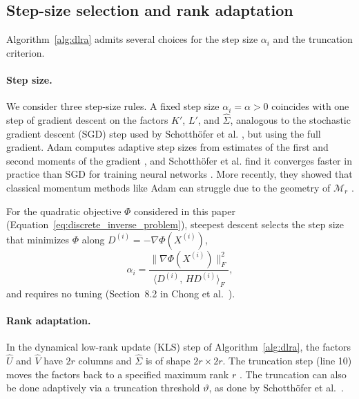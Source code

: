 \subsection{Step-size selection and rank adaptation}
Algorithm~\ref{alg:dlra} admits several choices for the step size $\alpha_i$ and the truncation criterion.

\paragraph{Step size.}
We consider three step-size rules. A fixed step size $\alpha_i = \alpha > 0$ coincides with one step of gradient descent on the factors $K'$, $L'$, and
$\hat \Sigma$, analogous to the stochastic gradient descent (SGD) step used by Schotthöfer et al. \cite{schotthoferLowrankLotteryTickets2022}, but using the full gradient. Adam computes adaptive step sizes from estimates of the first and second moments of the gradient \cite{kingmaAdamMethodStochastic2017}, and Schotthöfer et al. find it converges faster in practice than SGD for training neural networks \cite{schotthoferLowrankLotteryTickets2022}. More recently, they showed that classical momentum methods like Adam can struggle due to the geometry of $\mathcal{M}_r$ \cite{schotthoferGeometricFrameworkMomentumbased2025}.

For the quadratic objective $\Phi$ considered in this paper (Equation~\eqref{eq:discrete_inverse_problem}), steepest descent selects the step size that minimizes $\Phi$ along $D^{(i)} = -\nabla \Phi(X^{(i)})$,
\begin{equation*}
    \alpha_i = \frac{\|\nabla\Phi(X^{(i)})\|_F^2}
                    {\langle D^{(i)},\, H D^{(i)} \rangle_F},
\end{equation*}
and requires no tuning (Section~8.2 in Chong et al.\ 
\cite{chong2023introduction}).

\paragraph{Rank adaptation.} In the dynamical low-rank update (KLS) step of Algorithm~\ref{alg:dlra}, the factors $\hat{U}$ and $\hat{V}$ have $2r$ columns and $\hat{\Sigma}$ is of shape $2r \times 2r$. The truncation step (line 10) moves the factors back to a specified maximum rank $r$ \cite{schotthoferLowrankLotteryTickets2022}. The truncation can also be done adaptively via a truncation threshold $\vartheta$, as done by Schotthöfer et al.\ \cite{schotthoferLowrankLotteryTickets2022}. 


